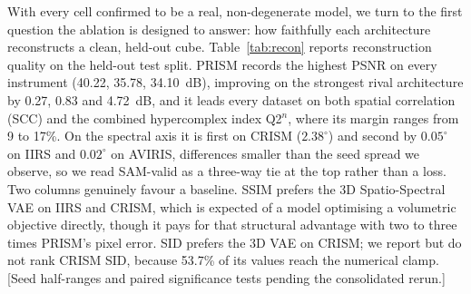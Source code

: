 \documentclass[twoside,11pt]{article}
\newcommand{\Qn}{Q2$^{n}$}
\begin{document}
With every cell confirmed to be a real, non-degenerate model, we turn to the first question the ablation is designed to answer: how faithfully each architecture reconstructs a clean, held-out cube. Table~\ref{tab:recon} reports reconstruction quality on the held-out test split. PRISM records the highest PSNR on every instrument (40.22, 35.78, 34.10~dB), improving on the strongest rival architecture by 0.27, 0.83 and 4.72~dB, and it leads every dataset on both spatial correlation (SCC) and the combined hypercomplex index \Qn, where its margin ranges from 9 to 17\%. On the spectral axis it is first on CRISM ($2.38^\circ$) and second by $0.05^\circ$ on IIRS and $0.02^\circ$ on AVIRIS, differences smaller than the seed spread we observe, so we read SAM-valid as a three-way tie at the top rather than a loss. Two columns genuinely favour a baseline. SSIM prefers the 3D Spatio-Spectral VAE on IIRS and CRISM, which is expected of a model optimising a volumetric objective directly, though it pays for that structural advantage with two to three times PRISM's pixel error. SID prefers the 3D VAE on CRISM; we report but do not rank CRISM SID, because 53.7\% of its values reach the numerical clamp. [Seed half-ranges and paired significance tests pending the consolidated rerun.]
\end{document}

